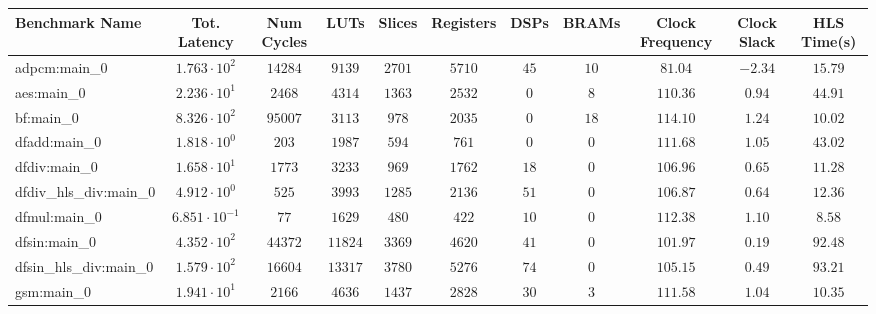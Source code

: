 \begin{tabular}{|l|c|c|c|c|c|c|c|c|c|c|}
\hline
Benchmark Name          & Tot. Latency            & Num Cycles & LUTs      & Slices    & Registers & DSPs    & BRAMs   & Clock Frequency & Clock Slack & HLS Time(s) \\
\hline
adpcm:main\_0           & $ 1.763 \cdot 10^{2}  $ & $ 14284  $ & $ 9139  $ & $ 2701  $ & $ 5710  $ & $ 45  $ & $ 10  $ & $ 81.04       $ & $ -2.34   $ & $ 15.79   $ \\
aes:main\_0             & $ 2.236 \cdot 10^{1}  $ & $ 2468   $ & $ 4314  $ & $ 1363  $ & $ 2532  $ & $ 0   $ & $ 8   $ & $ 110.36      $ & $ 0.94    $ & $ 44.91   $ \\
bf:main\_0              & $ 8.326 \cdot 10^{2}  $ & $ 95007  $ & $ 3113  $ & $ 978   $ & $ 2035  $ & $ 0   $ & $ 18  $ & $ 114.10      $ & $ 1.24    $ & $ 10.02   $ \\
dfadd:main\_0           & $ 1.818 \cdot 10^{0}  $ & $ 203    $ & $ 1987  $ & $ 594   $ & $ 761   $ & $ 0   $ & $ 0   $ & $ 111.68      $ & $ 1.05    $ & $ 43.02   $ \\
dfdiv:main\_0           & $ 1.658 \cdot 10^{1}  $ & $ 1773   $ & $ 3233  $ & $ 969   $ & $ 1762  $ & $ 18  $ & $ 0   $ & $ 106.96      $ & $ 0.65    $ & $ 11.28   $ \\
dfdiv\_hls\_div:main\_0 & $ 4.912 \cdot 10^{0}  $ & $ 525    $ & $ 3993  $ & $ 1285  $ & $ 2136  $ & $ 51  $ & $ 0   $ & $ 106.87      $ & $ 0.64    $ & $ 12.36   $ \\
dfmul:main\_0           & $ 6.851 \cdot 10^{-1} $ & $ 77     $ & $ 1629  $ & $ 480   $ & $ 422   $ & $ 10  $ & $ 0   $ & $ 112.38      $ & $ 1.10    $ & $ 8.58    $ \\
dfsin:main\_0           & $ 4.352 \cdot 10^{2}  $ & $ 44372  $ & $ 11824 $ & $ 3369  $ & $ 4620  $ & $ 41  $ & $ 0   $ & $ 101.97      $ & $ 0.19    $ & $ 92.48   $ \\
dfsin\_hls\_div:main\_0 & $ 1.579 \cdot 10^{2}  $ & $ 16604  $ & $ 13317 $ & $ 3780  $ & $ 5276  $ & $ 74  $ & $ 0   $ & $ 105.15      $ & $ 0.49    $ & $ 93.21   $ \\
gsm:main\_0             & $ 1.941 \cdot 10^{1}  $ & $ 2166   $ & $ 4636  $ & $ 1437  $ & $ 2828  $ & $ 30  $ & $ 3   $ & $ 111.58      $ & $ 1.04    $ & $ 10.35   $ \\

\end{tabular}

